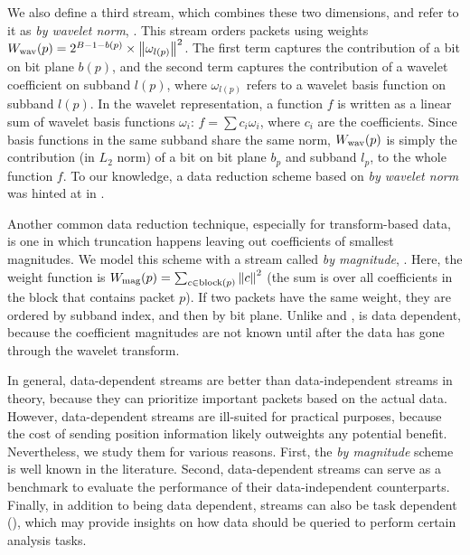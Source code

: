 We also define a third stream, which combines these two dimensions, and refer
to it as \emph{by wavelet norm}, \swav.  This stream orders packets using
weights $\wwav(p)=2^{B-1-b(p)}\times \norm{\omega_{l(p)}}^2$. The first term
captures the contribution of a bit on bit plane $b(p)$, and the second term
captures the contribution of a wavelet coefficient on subband $l(p)$, where
$\omega_{l(p)}$ refers to a wavelet basis function on subband $l(p)$. In the
wavelet representation, a function $f$ is written as a linear sum of wavelet
basis functions $\omega_i$: $f=\sum{c_i\omega_i}$, where $c_i$ are the
coefficients. Since basis functions in the same subband share the same norm,
$\wwav(p)$ is simply the contribution (in $L_2$ norm) of a bit on bit plane
$b_p$ and subband $l_p$, to the whole function $f$. To our knowledge, a data
reduction scheme based on \emph{by wavelet norm} was hinted at in
\todo{[CITE]}. 

Another common data reduction technique, especially for transform-based data,
is one in which truncation happens leaving out coefficients of smallest
magnitudes. We model this scheme with a stream called \emph{by magnitude},
\smag. Here, the weight function is $\wmag(p)=\sum_{c\in
\text{block}(p)}\norm{c}^2$ (the sum is over all coefficients in the block that
contains packet $p$). If two packets have the same weight, they are ordered by
subband index, and then by bit plane. Unlike \slvl and \sbit, \smag
is data dependent, because the coefficient magnitudes are not known until after
the data has gone through the wavelet transform.

In general, data-dependent streams are better than data-independent streams in
theory, because they can prioritize important packets based on the actual data.
However, data-dependent streams are ill-suited for practical purposes, because
the cost of sending position information likely outweights any potential
benefit. Nevertheless, we study them for various reasons. First, the \emph{by
magnitude} scheme is well known in the literature. Second, data-dependent
streams can serve as a benchmark to evaluate the performance of their
data-independent counterparts. Finally, in addition to being data dependent,
streams can also be task dependent (), which may
provide insights on how data should be queried to perform certain analysis
tasks.

